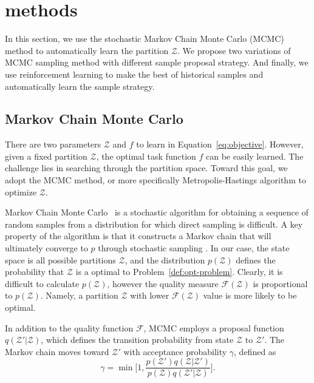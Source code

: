 \section{methods}
\label{sec:method}

In this section, we use the stochastic Markov Chain Monte Carlo (MCMC) method to automatically learn the partition $\mathcal{Z}$. We propose two variations of MCMC sampling method with different sample proposal strategy. And finally, we use reinforcement learning to make the best of historical samples and automatically learn the sample strategy.


\subsection{Markov Chain Monte Carlo}

There are two parameters $\mathcal{Z}$ and $f$ to learn in Equation~\ref{eq:objective}. However, given a fixed partition $\mathcal{Z}$, the optimal task function $f$ can be easily learned. The challenge lies in searching through the partition space. Toward this goal, we adopt the MCMC method, or more specifically Metropolis-Hastings algorithm to optimize $\mathcal{Z}$. 

Markov Chain Monte Carlo~\cite{andrieu2003introduction} is a stochastic algorithm for obtaining a sequence of random samples from a distribution for which direct sampling is difficult. A key property of the algorithm is that it constructs a Markov chain that will ultimately converge to $p$ through stochastic sampling \cite{ml:murphy}. In our case, the state space is all possible partitions $\mathcal{Z}$, and the distribution $p(\mathcal{Z})$ defines the probability that $\mathcal{Z}$ is a optimal to Problem~\ref{def:opt-problem}. Clearly, it is difficult to calculate $p(\mathcal{Z})$, however the quality measure $\mathcal{F}(\mathcal{Z})$ is proportional to $p(\mathcal{Z})$. Namely, a partition $\mathcal{Z}$ with lower $\mathcal{F}(\mathcal{Z})$ value is more likely to be optimal.


In addition to the quality function $\mathcal{F}$, MCMC employs a proposal function $q(\mathcal{Z}'|\mathcal{Z})$, which defines the transition probability from state $\mathcal{Z}$ to $\mathcal{Z}'$. The Markov chain moves toward $\mathcal{Z}'$ with acceptance probability $\gamma$, defined as
\begin{equation}
\gamma = \min \Big [ 1, \frac{p(\mathcal{Z}')q(\mathcal{Z}| \mathcal{Z}')}{p(\mathcal{Z})q(\mathcal{Z}'|\mathcal{Z})} \Big ].
\label{eq:gamma}
\end{equation}

